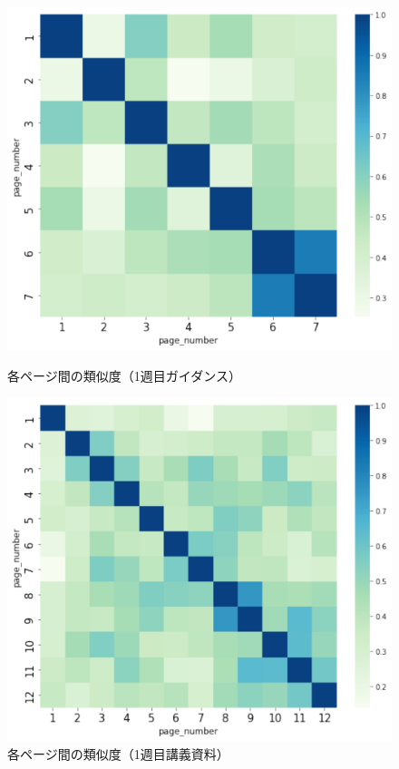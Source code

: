 \documentclass[a4paper,12pt]{ltjsreport}
\begin{document}
\begin{figure}[tbp]
  \begin{minipage}[b]{0.5\linewidth}
    \centering
    \includegraphics[scale=0.35]{1cos.pdf}
    \caption{各ページ間の類似度（1週目ガイダンス）}
    \label{fig:1cos}
  \end{minipage}
  \begin{minipage}[b]{0.5\linewidth}
    \centering
    \includegraphics[scale=0.35]{1_cos.pdf}
    \caption{各ページ間の類似度（1週目講義資料）}
    \label{fig:1-cos}
  \end{minipage}
\end{figure}
\end{document}
